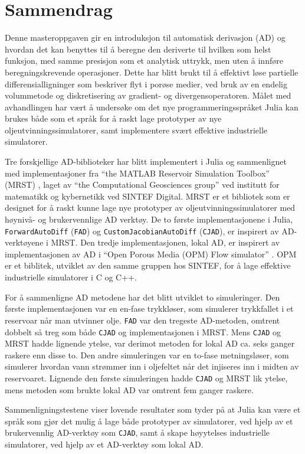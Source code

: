 \chapter*{Sammendrag}
Denne masteroppgaven gir en introduksjon til automatisk derivasjon (AD) og hvordan det kan benyttes til å beregne den deriverte til hvilken som helst funksjon, med samme presisjon som et analytisk uttrykk, men uten å innføre beregningskrevende operasjoner. Dette har blitt brukt til å effektivt løse partielle differensialligninger som beskriver flyt i porøse medier, ved bruk av en endelig volummetode og diskretisering av gradient- og divergensoperatoren. Målet med avhandlingen har vært å undersøke om det nye programmeringsspråket Julia kan brukes både som et språk for å raskt lage prototyper av nye oljeutvinningssimulatorer, samt implementere svært effektive industrielle simulatorer.

Tre forskjellige AD-biblioteker har blitt implementert i Julia og sammenlignet med implementasjoner fra \enquote{the MATLAB Reservoir Simulation Toolbox} (MRST) \emph{\citep{mrstHomepage}}, laget av \enquote{the Computational Geosciences group} ved institutt for matematikk og kybernetikk ved SINTEF Digital. MRST er et bibliotek som er designet for å raskt kunne lage nye prototyper av oljeutvinningssimulatorer med høynivå- og brukervennlige AD verktøy. De to første implementasjonene i Julia, \texttt{ForwardAutoDiff} (\texttt{FAD}) og \texttt{CustomJacobianAutoDiff} (\texttt{CJAD}), er inspirert av AD-verktøyene i MRST. Den tredje implementasjonen, lokal AD, er inspirert av implementasjonen av AD i \enquote{Open Porous Media (OPM) Flow simulator} \emph{\citep{opm}}. OPM er et biblitek, utviklet av den samme gruppen hos SINTEF, for å lage effektive industrielle simulatorer i C og C++.

For å sammenligne AD metodene har det blitt utviklet to simuleringer. Den første implementasjonen var en en-fase trykkløser, som simulerer trykkfallet i et reservoar når man utvinner olje. \texttt{FAD} var den tregeste AD-metoden, omtrent dobbelt så treg som både \texttt{CJAD} og implementasjonen i MRST. Mens \texttt{CJAD} og MRST hadde lignende ytelse, var derimot metoden for lokal AD ca. seks ganger raskere enn disse to. Den andre simuleringen var en to-fase metningsløser, som simulerer hvordan vann strømmer inn i oljefeltet når det injiseres inn i midten av reservoaret. Lignende den første simuleringen hadde \texttt{CJAD} og MRST lik ytelse, mens metoden som brukte lokal AD var omtrent fem ganger raskere.

Sammenligningstestene viser lovende resultater som tyder på at Julia kan være et språk som gjør det mulig å lage både prototyper av simulatorer, ved hjelp av et brukervennlig AD-verktøy som \texttt{CJAD}, samt å skape høyytelses industrielle simulatorer, ved hjelp av et AD-verktøy som lokal AD.